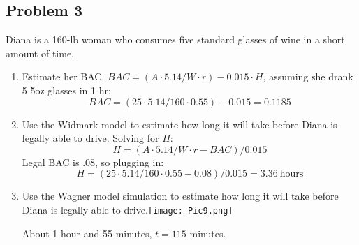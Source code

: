 \documentclass{article}
\newcommand{\myskip}{\par\null\par}
\begin{document}
\subsection*{Problem 3}Diana is a 160-lb woman who consumes five standard glasses of wine in a short amount of time.\begin{enumerate}[label=(\alph*)]
    \item Estimate her BAC. $BAC = (A\cdot 5.14 / W \cdot r) - 0.015\cdot H$, assuming she drank 5 5oz glasses in 1 hr: $$BAC=(25\cdot5.14/160\cdot0.55) - 0.015=0.1185$$ 
    \item Use the Widmark model to estimate how long it will take before Diana is legally able to drive. Solving for $H$: $$H = (A \cdot 5.14 / W\cdot r - BAC) / 0.015$$ Legal BAC is .08, so plugging in: $$H = (25\cdot 5.14 / 160\cdot0.55 - 0.08) / 0.015=3.36\ \mathrm{hours}$$
    \item Use the Wagner model simulation to estimate how long it will take before Diana is legally able to drive.\newline\texttt{[image: Pic9.png]}\myskip About 1 hour and 55 minutes, $t=115$ minutes.
\end{enumerate}
\end{document}
